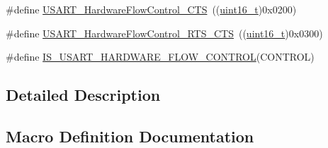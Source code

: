 \begin{DoxyCompactItemize}
\item 
\#define \hyperlink{group___u_s_a_r_t___hardware___flow___control_ga4d989f112f94009c0849fe4dbe829d81}{U\+S\+A\+R\+T\+\_\+\+Hardware\+Flow\+Control\+\_\+\+C\+TS}~((\hyperlink{_p_e___types_8h_a1f1825b69244eb3ad2c7165ddc99c956}{uint16\+\_\+t})0x0200)
\item 
\#define \hyperlink{group___u_s_a_r_t___hardware___flow___control_ga2986aed8c6cba414ac8afe0180ab553e}{U\+S\+A\+R\+T\+\_\+\+Hardware\+Flow\+Control\+\_\+\+R\+T\+S\+\_\+\+C\+TS}~((\hyperlink{_p_e___types_8h_a1f1825b69244eb3ad2c7165ddc99c956}{uint16\+\_\+t})0x0300)
\item 
\#define \hyperlink{group___u_s_a_r_t___hardware___flow___control_ga9b905eb465780173a2e98bc8b602c030}{I\+S\+\_\+\+U\+S\+A\+R\+T\+\_\+\+H\+A\+R\+D\+W\+A\+R\+E\+\_\+\+F\+L\+O\+W\+\_\+\+C\+O\+N\+T\+R\+OL}(C\+O\+N\+T\+R\+OL)
\end{DoxyCompactItemize}


\subsection{Detailed Description}


\subsection{Macro Definition Documentation}
